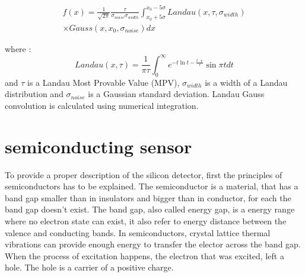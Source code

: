 \begin{equation}
    \begin{split}
    f(x) = \frac{1}{\sqrt{2 \pi}} \frac{\tau}{\sigma_{noise} \sigma_{width}} \int_{x_0+5\sigma}^{x_0-5\sigma} Landau(x, \tau, \sigma_{width}) \\ \times Gauss (x, x_0,\sigma_{noise}) dx
    \end{split}
\end{equation}

where :
\begin{equation}
    Landau(x,\tau) =  \frac{1}{\pi \tau} \int_{0}^{\infty} e^{-t \ln t - \frac{t \cdot x}{\tau}} \sin{\pi t} dt
\end{equation}
and $\tau$ is a Landau Most Provable Value (MPV), $\sigma_{width}$ is a width of a Landau distribution and $\sigma_{noise}$ is a Gaussian standard deviation. Landau Gauss convolution is calculated using numerical integration. 


\section{semiconducting sensor}
To provide a proper description of the silicon detector, first the principles of semiconductors has to be explained. 
The semiconductor is a material, that has a band gap smaller than in insulators and bigger than in conductor, for each the band gap doesn't exist. The band gap, also called energy gap, is a energy range where no electron state can exist, it also refer to energy distance between the valence and conducting bands. In semiconductors, crystal lattice thermal vibrations can provide enough energy to transfer the elector across the band gap. When the process of excitation happens, the electron that was excited, left a hole. The hole is a carrier of a positive charge. 
